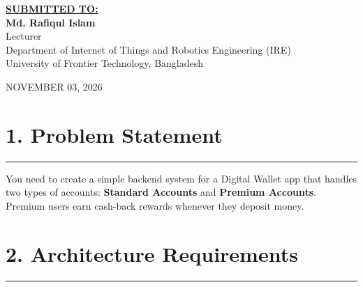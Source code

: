 \documentclass[11pt,a4paper]{article}
\begin{document}
\begin{titlepage}
    {\small \textbf{\underline{SUBMITTED TO:}}}\\[0.22cm]
    {\large \textbf{Md. Rafiqul Islam}}\\[0.14cm]
    {\small Lecturer}\\[0.1cm]
    {\footnotesize Department of Internet of Things and Robotics Engineering (IRE)}\\[0.08cm]
    {\footnotesize University of Frontier Technology, Bangladesh}

    \vfill
    {\footnotesize NOVEMBER 03, 2026}
    \vspace*{0.3cm}
\end{titlepage}

\newpage
{}

\section*{1. Problem Statement}
\noindent\rule{\textwidth}{0.5pt}\vspace{0.15cm}

You need to create a simple backend system for a Digital Wallet app that handles two types of accounts: \textbf{Standard Accounts} and \textbf{Premium Accounts}. Premium users earn cash-back rewards whenever they deposit money.

\vspace{0.25cm}
\section*{2. Architecture Requirements}
\noindent\rule{\textwidth}{0.5pt}\vspace{0.15cm}
\end{document}
